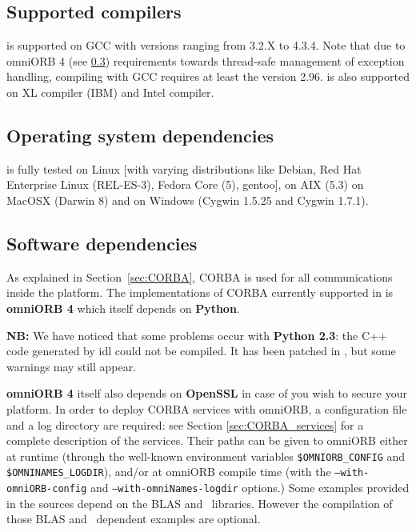 \subsection{Supported compilers}
\diet is supported on GCC with versions ranging from 3.2.X to 4.3.4.  Note that
due to omniORB 4 (see \ref{sec:software_dependencies}) requirements towards
thread-safe management of exception handling, compiling \diet with GCC
requires at least the version 2.96.
\diet is also supported on XL compiler (IBM) and Intel compiler.

\subsection{Operating system dependencies}
\diet is fully tested on Linux [with varying distributions like Debian, Red Hat
  Enterprise Linux (REL-ES-3), Fedora Core (5), gentoo], on AIX (5.3) on MacOSX
(Darwin 8) and on Windows (Cygwin 1.5.25 and Cygwin 1.7.1).

\subsection{Software dependencies}
\label{sec:software_dependencies}

As explained in Section~\ref{sec:CORBA}, CORBA is used for all communications
inside the platform.  The implementations of CORBA currently supported in \diet
is \textbf{omniORB 4} which itself depends on \textbf{Python}.

\noindent 
\textbf{NB:} We have noticed that some problems occur with \textbf{Python 2.3}:
the C++ code generated by idl could not be compiled. It has been patched in
\diet, but some warnings may still appear.

\textbf{omniORB 4} itself also depends on \textbf{OpenSSL} in case of you wish to
secure your \diet platform. In order to deploy CORBA services with omniORB, a configuration file and a log
directory are required: see Section \ref{sec:CORBA_services} for a complete
description of the services.  Their paths can be given to omniORB either at
runtime (through the well-known environment variables
\texttt{\$OMNIORB\_CONFIG} and \texttt{\$OMNINAMES\_LOGDIR}), and/or at omniORB
compile time (with the \linebreak\texttt{--with-omniORB-config} and
\texttt{--with-omniNames-logdir} options.)  Some examples provided in the \diet
sources depend on the BLAS and \scalapack\ libraries. However the compilation
of those BLAS and \scalapack\ dependent examples are optional.

